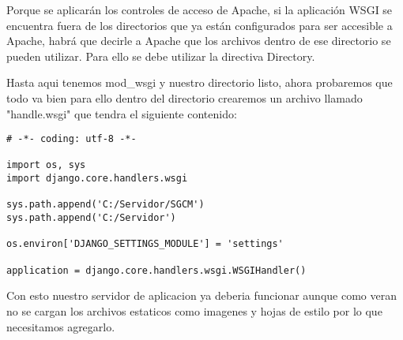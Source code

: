 Porque se aplicarán los controles de acceso de Apache, si la aplicación WSGI se
 encuentra fuera de los directorios que ya están configurados para ser accesible a
  Apache, habrá que decirle a Apache que los archivos dentro de ese directorio se
  pueden utilizar. Para ello se debe utilizar la directiva Directory.

Hasta aqui tenemos mod\_wsgi y nuestro directorio listo, ahora probaremos que
todo va bien para ello dentro del directorio crearemos un archivo llamado
"handle.wsgi" que tendra el siguiente contenido:

\begin{lstlisting}[style=Python]
# -*- coding: utf-8 -*-

import os, sys
import django.core.handlers.wsgi

sys.path.append('C:/Servidor/SGCM')
sys.path.append('C:/Servidor')

os.environ['DJANGO_SETTINGS_MODULE'] = 'settings'

application = django.core.handlers.wsgi.WSGIHandler()

\end{lstlisting}
\vspace{0.1cm}


Con esto nuestro servidor de aplicacion ya deberia funcionar aunque como veran
no se cargan los archivos estaticos como imagenes y hojas de estilo por lo
que necesitamos agregarlo.



